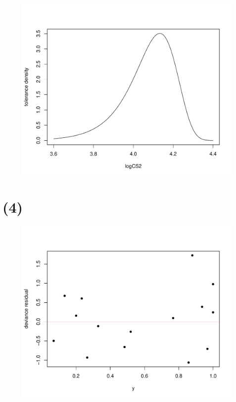 \documentclass[12pt]{article}
\begin{document}
\begin{figure}[h] 
\includegraphics[width=1.0\textwidth]{Rplot2.pdf}
\caption{}
\end{figure}


\section*{(4)}
\begin{figure}[h] 
\includegraphics[width=1.0\textwidth]{Rplot3.pdf}
\caption{}
\end{figure}
\end{document}
